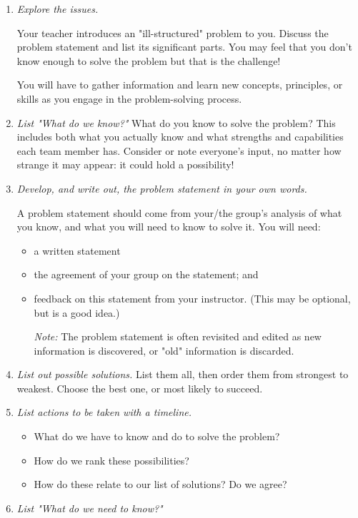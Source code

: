 \begin{enumerate}
\item \textit{Explore the issues.} 

Your teacher introduces an "ill-structured" problem to you.
Discuss the problem statement and list its significant parts.
You may feel that you don't know enough to solve the problem but that is the
challenge!

You will have to gather information and learn new concepts, principles, or skills as you
engage in the problem-solving process.

\item \textit{List "What do we know?"} What do you know to solve the problem?
This includes both what you actually know and what strengths and capabilities each
team member has.
Consider or note everyone's input, no matter how strange it may appear: it could hold a
possibility!

\item \textit{Develop, and write out, the problem statement in your own words.} 

A problem statement should come from your/the group's analysis of what you know,
and what you will need to know to solve it. You will need:

	\begin{itemize}
	\item a written statement
	\item the agreement of your group on the statement; and
	\item feedback on this statement from your instructor.
	(This may be optional, but is a good idea.)
	
	\textit{Note:} The problem statement is often revisited and edited as new information is
	discovered, or "old" information is discarded.
	\end{itemize}
\item\label{chap8item:1} \textit{List out possible solutions.} List them all, then order them from strongest to weakest.
Choose the best one, or most likely to succeed.
\item \textit{List actions to be taken with a timeline.} 
	\begin{itemize}
	\item What do we have to know and do to solve the problem?
	\item How do we rank these possibilities?
	\item How do these relate to our list of solutions?
	Do we agree?
	\end{itemize}
\item \textit{List "What do we need to know?"}


\end{enumerate}
